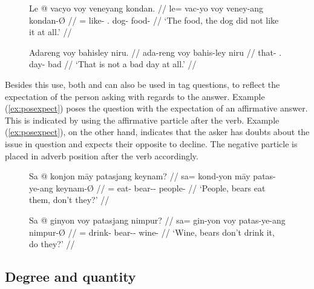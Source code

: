 \begin{figure}[h]
\pex\label{ex:voyintens}
\a\begingl
	\gla Le @ vacyo voy veneyang kondan. //
	\glb le= vac-yo voy veney-ang kondan-Ø //
	\glc \PatTI{}= like-\TsgN{} \Int{}.\Neg{} dog-\Aarg{} food-\Top{} //
	\glft `The food, the dog did not like it at all.' //
\endgl

\a\begingl
	\gla Adareng voy bahisley niru. //
	\glb ada-reng voy bahis-ley niru //
	\glc that-\AargI{} \Int{}.\Neg{} day-\PargI{} bad // 
	\glft `That is not a bad day at all.' //
\endgl
\xe
\end{figure}

Besides this use, both  and  can also be used in
tag questions, to reflect the expectation of the person asking with regards to
the answer. Example (\ref{ex:posexpect}) poses the question with the
expectation of an affirmative answer. This is indicated by using the
affirmative particle  after the verb. Example 
(\ref{ex:posexpect}), on the other hand, indicates that the asker has doubts
about the issue in question and expects their opposite to decline. The negative
particle  is placed in adverb position after the verb
accordingly.

\begin{figure}[h]
\pex
\a\label{ex:posexpect}\begingl
	\gla Sa @ konjon māy patasjang keynam? //
	\glb sa= kond-yon māy patas-ye-ang keynam-Ø //
	\glc \PatT{}= eat-\TplN{} \Aff{} bear-\Pl{}-\Aarg{} people-\Top{} //
	\glft `People, bears eat them, don't they?' //
\endgl

\a\label{ex:negexpect}\begingl
	\gla Sa @ ginyon voy patasjang nimpur? //
	\glb sa= gin-yon voy patas-ye-ang nimpur-Ø //
	\glc \PatT{}= drink-\TplN{} \Neg{} bear-\Pl{}-\Aarg{} wine-\Top{} //
	\glft `Wine, bears don't drink it, do they?' //
\endgl
\xe
\end{figure}


\subsection{Degree and quantity}
\label{subsec:quantifiers}

